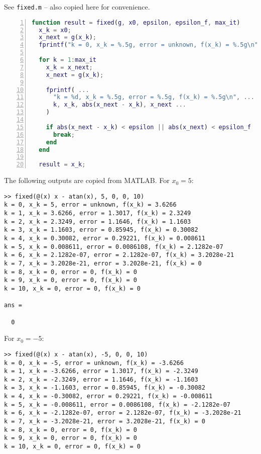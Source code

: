 \documentclass{homework}
\begin{document}
\begin{alphaparts}
	\questionpart See \verb*|fixed.m| -- also copied here for convenience.
	\begin{lstlisting}[language=MATLAB, numbers=left, frame=single, basicstyle=\small\ttfamily]
function result = fixed(g, x0, epsilon, epsilon_f, max_it)
  x_k = x0;
  x_next = g(x_k);
  fprintf("k = 0, x_k = %.5g, error = unknown, f(x_k) = %.5g\n", x_k, x_next);

  for k = 1:max_it
    x_k = x_next;
    x_next = g(x_k);

    fprintf( ...
      "k = %d, x_k = %.5g, error = %.5g, f(x_k) = %.5g\n", ...
      k, x_k, abs(x_next - x_k), x_next ...
    )

    if abs(x_next - x_k) < epsilon || abs(x_next) < epsilon_f
      break;
    end
  end

  result = x_k;

	\end{lstlisting}
	The following outputs are copied from MATLAB. For $x_0 = 5$:
	\begin{lstlisting}[basicstyle=\small\ttfamily, frame=single]
>> fixed(@(x) x - atan(x), 5, 0, 0, 10)
k = 0, x_k = 5, error = unknown, f(x_k) = 3.6266
k = 1, x_k = 3.6266, error = 1.3017, f(x_k) = 2.3249
k = 2, x_k = 2.3249, error = 1.1646, f(x_k) = 1.1603
k = 3, x_k = 1.1603, error = 0.85945, f(x_k) = 0.30082
k = 4, x_k = 0.30082, error = 0.29221, f(x_k) = 0.008611
k = 5, x_k = 0.008611, error = 0.0086108, f(x_k) = 2.1282e-07
k = 6, x_k = 2.1282e-07, error = 2.1282e-07, f(x_k) = 3.2028e-21
k = 7, x_k = 3.2028e-21, error = 3.2028e-21, f(x_k) = 0
k = 8, x_k = 0, error = 0, f(x_k) = 0
k = 9, x_k = 0, error = 0, f(x_k) = 0
k = 10, x_k = 0, error = 0, f(x_k) = 0

ans =

  0
  	\end{lstlisting}
  	For $x_0 = -5$:
  	\begin{lstlisting}[basicstyle=\small\ttfamily, frame=single]
>> fixed(@(x) x - atan(x), -5, 0, 0, 10)
k = 0, x_k = -5, error = unknown, f(x_k) = -3.6266
k = 1, x_k = -3.6266, error = 1.3017, f(x_k) = -2.3249
k = 2, x_k = -2.3249, error = 1.1646, f(x_k) = -1.1603
k = 3, x_k = -1.1603, error = 0.85945, f(x_k) = -0.30082
k = 4, x_k = -0.30082, error = 0.29221, f(x_k) = -0.008611
k = 5, x_k = -0.008611, error = 0.0086108, f(x_k) = -2.1282e-07
k = 6, x_k = -2.1282e-07, error = 2.1282e-07, f(x_k) = -3.2028e-21
k = 7, x_k = -3.2028e-21, error = 3.2028e-21, f(x_k) = 0
k = 8, x_k = 0, error = 0, f(x_k) = 0
k = 9, x_k = 0, error = 0, f(x_k) = 0
k = 10, x_k = 0, error = 0, f(x_k) = 0


\end{lstlisting}
\end{alphaparts}
\end{document}
